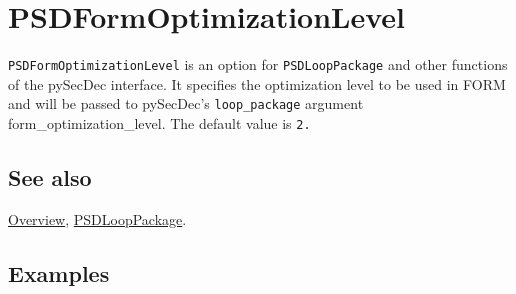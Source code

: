 \documentclass[../FeynHelpersManual.tex]{subfiles}
\begin{document}
\hypertarget{psdformoptimizationlevel}{
\section{PSDFormOptimizationLevel}\label{psdformoptimizationlevel}}

\texttt{PSDFormOptimizationLevel} is an option for
\texttt{PSDLoopPackage} and other functions of the pySecDec interface.
It specifies the optimization level to be used in FORM and will be
passed to pySecDec's \texttt{loop_package} argument
form\_optimization\_level. The default value is \texttt{2.}

\subsection{See also}

\hyperlink{toc}{Overview}, \hyperlink{psdlooppackage}{PSDLoopPackage}.

\subsection{Examples}
\end{document}
